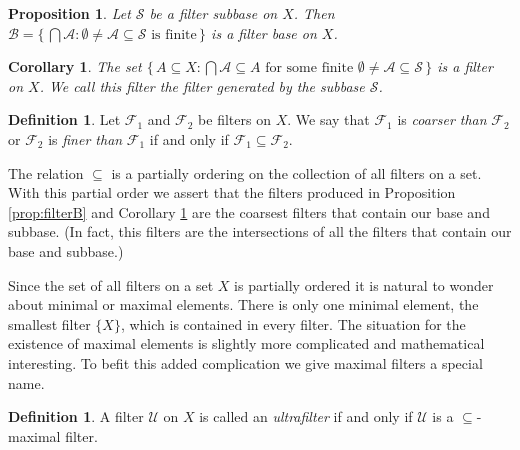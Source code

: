 \documentclass[12pt]{article}
\theoremstyle{plain}
\newtheorem{prop}[thm]{Proposition}
\newtheorem{cor}[thm]{Corollary}
\theoremstyle{definition}
\newtheorem{defn}[thm]{Definition}
\newcommand{\calA}{\mathcal{A}}
\newcommand{\calB}{\mathcal{B}}
\newcommand{\calF}{\mathcal{F}}
\newcommand{\calS}{\mathcal{S}}
\newcommand{\calU}{\mathcal{U}}
\begin{document}
\begin{prop}
  Let $\calS$ be a filter subbase on $X$.
  Then $\calB = \{\, \bigcap \calA : \mbox{$\emptyset \ne \calA
    \subseteq \calS$ is finite} \,\}$ is a filter base on $X$.
\end{prop}

\begin{cor}
  \label{cor:filterSB}
  The set $\{\, A \subseteq X : \mbox{$\bigcap\calA \subseteq A$ for
    some finite $\emptyset \ne \calA \subseteq \calS$} \,\}$ is a
  filter on $X$.
  We call this filter the \textsl{filter generated by the subbase $\calS$}.
\end{cor}

\begin{defn}
  Let $\calF_1$ and $\calF_2$ be filters on $X$.
  We say that $\calF_1$ is \textsl{coarser than} $\calF_2$ or
  $\calF_2$ is \textsl{finer than} $\calF_1$ if and only if $\calF_1
  \subseteq \calF_2$. 
\end{defn}

The relation $\subseteq$ is a partially ordering on the collection of
all filters on a set. 
With this partial order we assert that the filters produced in
Proposition \ref{prop:filterB} and Corollary \ref{cor:filterSB} are
the coarsest filters that contain our base and subbase. 
(In fact, this filters are the intersections of all the filters that
contain our base and subbase.)

Since the set of all filters on a set $X$ is partially ordered it is
natural to wonder about minimal or maximal elements.  
There is only one minimal element, the smallest filter $\{X\}$, which
is contained in every filter.
The situation for the existence of maximal elements is slightly more
complicated and mathematical interesting.
To befit this added complication we give maximal filters a special
name.

\begin{defn}
  A filter $\calU$ on $X$ is called an \textsl{ultrafilter} if and
  only if $\calU$ is a \mbox{$\subseteq$-maximal} filter.
\end{defn}
\end{document}
